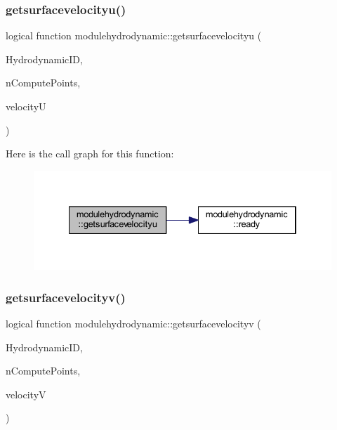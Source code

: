 \subsubsection{\texorpdfstring{getsurfacevelocityu()}{getsurfacevelocityu()}}
{\footnotesize\ttfamily logical function modulehydrodynamic\+::getsurfacevelocityu (\begin{DoxyParamCaption}\item[{integer}]{Hydrodynamic\+ID,  }\item[{integer}]{n\+Compute\+Points,  }\item[{real(8), dimension(ncomputepoints)}]{velocityU }\end{DoxyParamCaption})\hspace{0.3cm}{\ttfamily [private]}}

Here is the call graph for this function\+:\nopagebreak
\begin{figure}[H]
\begin{center}
\leavevmode
\includegraphics[width=334pt]{namespacemodulehydrodynamic_a9b4a77f72b7a93ea81baa40e63f809a2_cgraph}
\end{center}
\end{figure}
\mbox{\label{namespacemodulehydrodynamic_a7b33d38f90e3b125d5fe454fd30c25b9}} 
\subsubsection{\texorpdfstring{getsurfacevelocityv()}{getsurfacevelocityv()}}
{\footnotesize\ttfamily logical function modulehydrodynamic\+::getsurfacevelocityv (\begin{DoxyParamCaption}\item[{integer}]{Hydrodynamic\+ID,  }\item[{integer}]{n\+Compute\+Points,  }\item[{real(8), dimension(ncomputepoints)}]{velocityV }\end{DoxyParamCaption})\hspace{0.3cm}{\ttfamily [private]}}

